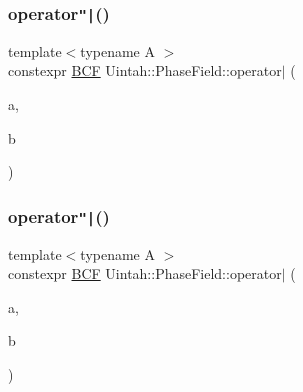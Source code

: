 \mbox{\label{namespaceUintah_1_1PhaseField_aa2de98442fe079b97ff71c974452edf2}} 
\subsubsection{\texorpdfstring{operator\texttt{"|}()}{operator|()}\hspace{0.1cm}{\footnotesize\ttfamily [2/3]}}
{\footnotesize\ttfamily template$<$typename A $>$ \\
constexpr \hyperlink{namespaceUintah_1_1PhaseField_ab9b5949afaa59b9b862e606410431331}{B\+CF} Uintah\+::\+Phase\+Field\+::operator$\vert$ (\begin{DoxyParamCaption}\item[{A}]{a,  }\item[{\hyperlink{namespaceUintah_1_1PhaseField_a148fba372aa3be96fd6eede7a2fa10b5}{BC}}]{b }\end{DoxyParamCaption})}

\mbox{\label{namespaceUintah_1_1PhaseField_aef70a549ef150398587c759d5676b128}} 
\subsubsection{\texorpdfstring{operator\texttt{"|}()}{operator|()}\hspace{0.1cm}{\footnotesize\ttfamily [3/3]}}
{\footnotesize\ttfamily template$<$typename A $>$ \\
constexpr \hyperlink{namespaceUintah_1_1PhaseField_ab9b5949afaa59b9b862e606410431331}{B\+CF} Uintah\+::\+Phase\+Field\+::operator$\vert$ (\begin{DoxyParamCaption}\item[{A}]{a,  }\item[{Patch\+::\+Face\+Type}]{b }\end{DoxyParamCaption})}

\mbox{\label{namespaceUintah_1_1PhaseField_ae83ff43dad3972682130259154aa13ef}} 
